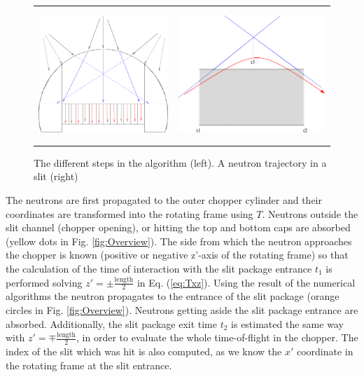 \begin{figure}
\begin{center}
\begin{tabular}{cc}
\includegraphics[height=5cm]{./figures/FCAlgo}
&
\includegraphics[height=5cm]{./figures/FCtangents}
\end{tabular}
\end{center}
\caption{The different steps in the algorithm (left). A neutron trajectory in a slit (right)}
\label{fig:TOFalg}
\end{figure}

The neutrons are first propagated to the outer chopper cylinder and their coordinates are transformed into the rotating frame using $T$. Neutrons outside the slit channel (chopper opening), or hitting the top and bottom caps are absorbed (yellow dots in Fig. \ref{fig:Overview}). The side from which the neutron approaches the chopper is known (positive or negative z'-axis of the rotating frame) so that the calculation of the time of interaction with the slit package entrance $t_1$ is performed solving $z' = \pm \frac{\textrm{length}}{2}$ in Eq. (\ref{eq:Txz}). Using the result of the numerical algorithms the neutron propagates to the entrance of the slit package (orange circles in Fig. \ref{fig:Overview}). Neutrons getting aside the slit package entrance are absorbed. Additionally, the slit package exit time $t_2$ is estimated the same way with $z' = \mp \frac{\textrm{length}}{2}$, in order to evaluate the whole time-of-flight in the chopper. The index of the slit which was hit is also computed, as we know the $x'$ coordinate in the rotating frame at the slit entrance.

